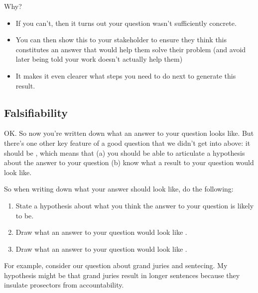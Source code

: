 \documentclass[letterpaper,10pt,english]{jupyterBook}
\begin{document}
\sphinxAtStartPar
Why?
\begin{itemize}
\item {} 
\sphinxAtStartPar
If you can’t, then it turns out your question wasn’t sufficiently concrete.

\item {} 
\sphinxAtStartPar
You can then show this to your stakeholder to ensure they think this constitutes an answer that would help them solve their problem (and avoid later being told your work doesn’t actually help them)

\item {} 
\sphinxAtStartPar
It makes it even clearer what steps you need to do next to generate this result.

\end{itemize}


\subsection{Falsifiability}
\label{\detokenize{40_in_practice/05_backwards_design:falsifiability}}
\sphinxAtStartPar
OK. So now you’re written down what an answer to your question looks like. But there’s one other key feature of a good question that we didn’t get into above: it should be , which means that (a) you should be able to articulate a hypothesis about the answer to your question  (b) know what a result to your question would look like.

\sphinxAtStartPar
So when writing down what your answer should look like, do the following:
\begin{enumerate}
%
\item {} 
\sphinxAtStartPar
State a hypothesis about what you think the answer to your question is likely to be.

\item {} 
\sphinxAtStartPar
Draw what an answer to your question would look like .

\item {} 
\sphinxAtStartPar
Draw what an answer to your question would look like .

\end{enumerate}

\sphinxAtStartPar
For example, consider our question about grand juries and sentecing. My hypothesis might be that grand juries result in longer sentences because they insulate prosectors from accountability.
\end{document}
